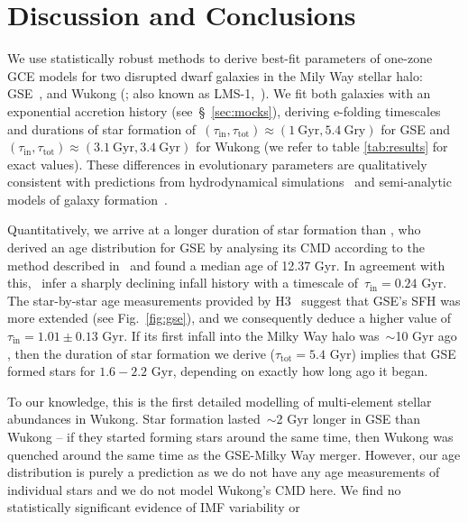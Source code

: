 \documentclass[ms.tex]{subfiles}
\begin{document}
\section{Discussion and Conclusions}
\label{sec:conclusions}

We use statistically robust methods to derive best-fit parameters of
one-zone GCE models for two disrupted dwarf galaxies in the Mily Way stellar
halo: GSE~\citep{Belokurov2018, Helmi2018}, and Wukong (\citealp{Naidu2020,
Naidu2022}; also known as LMS-1,~\citealp{Yuan2020}).
We fit both galaxies with an exponential accretion history
(see~\S~\ref{sec:mocks}), deriving e-folding timescales and durations of star
formation of~$(\tau_\text{in}, \tau_\text{tot}) \approx (1~\text{Gyr},
5.4~\text{Gry})$ for GSE and~$(\tau_\text{in}, \tau_\text{tot}) \approx
(3.1~\text{Gyr}, 3.4~\text{Gyr})$ for Wukong (we refer to table
\ref{tab:results} for exact values).
These differences in evolutionary parameters are qualitatively consistent with
predictions from hydrodynamical simulations~\citep[e.g.,][]{GarrisonKimmel2019}
and semi-analytic models of galaxy formation~\citep[e.g.,][]{Baugh2006,
Somerville2015a, Behroozi2019}.
\par
Quantitatively, we arrive at a longer duration of star formation than
\citet{Gallart2019}, who derived an age distribution for GSE by analysing its
CMD according to the method described in~\citet{Dolphin2002} and found a
median age of 12.37 Gyr.
In agreement with this,~\citet{Vincenzo2019} infer a sharply declining infall
history with a timescale of~$\tau_\text{in} = 0.24$ Gyr.
The star-by-star age measurements provided by H3~\citep{Conroy2019} suggest
that GSE's SFH was more extended (see Fig.~\ref{fig:gse}), and we consequently
deduce a higher value of~$\tau_\text{in} = 1.01 \pm 0.13$ Gyr.
If its first infall into the Milky Way halo was~$\sim$10 Gyr ago
\citep[e.g.,][]{Helmi2018, Bonaca2020}, then the duration of star formation we
derive ($\tau_\text{tot} = 5.4$ Gyr) implies that GSE formed stars for
$1.6 - 2.2$ Gyr, depending on exactly how long ago it began.
\par
To our knowledge, this is the first detailed modelling of multi-element stellar
abundances in Wukong.
Star formation lasted~$\sim$2 Gyr longer in GSE than Wukong -- if they started
forming stars around the same time, then Wukong was quenched around the same
time as the GSE-Milky Way merger.
However, our age distribution is purely a prediction as we do not have any age
measurements of individual stars and we do not model Wukong's CMD here.
We find no statistically significant evidence of IMF variability or
\end{document}
